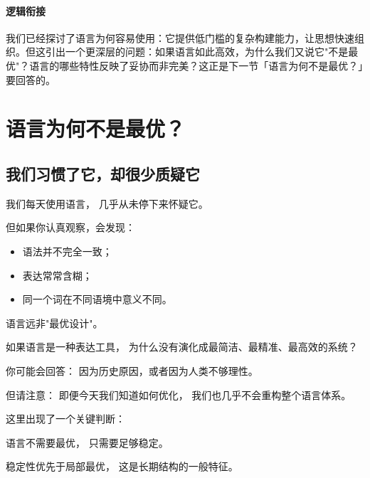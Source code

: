 \documentclass[openany, a4paper, 12pt]{book}
\begin{document}

\paragraph*{逻辑衔接}
我们已经探讨了语言为何容易使用：它提供低门槛的复杂构建能力，让思想快速组织。但这引出一个更深层的问题：如果语言如此高效，为什么我们又说它"不是最优"？语言的哪些特性反映了妥协而非完美？这正是下一节「语言为何不是最优？」要回答的。


\section{语言为何不是最优？}

\subsection{我们习惯了它，却很少质疑它}

我们每天使用语言，
几乎从未停下来怀疑它。

但如果你认真观察，会发现：

\begin{itemize}
	\item 语法并不完全一致；
	\item 表达常常含糊；
	\item 同一个词在不同语境中意义不同。
\end{itemize}

语言远非"最优设计"。

\begin{questionbox}
	如果语言是一种表达工具，
	为什么没有演化成最简洁、最精准、最高效的系统？
\end{questionbox}

\begin{tcolorbox}[colback=yellow!5,title=\textit{读者行为预测}]
	你可能会回答：
	因为历史原因，或者因为人类不够理性。

	但请注意：
	即便今天我们知道如何优化，
	我们也几乎不会重构整个语言体系。
\end{tcolorbox}

这里出现了一个关键判断：

语言不需要最优，
只需要足够稳定。

\begin{readingnote}
	稳定性优先于局部最优，
	这是长期结构的一般特征。
\end{readingnote}
\end{document}
